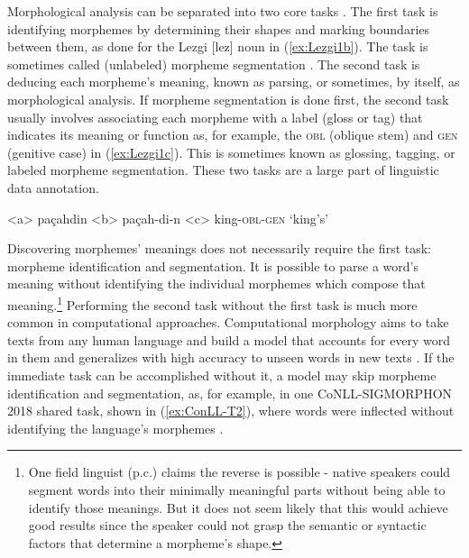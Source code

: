 \documentclass[12pt]{article}
\begin{document}
Morphological analysis can be separated into two core tasks \cite{cotterell_labeled_2015,hammarstrom_unsupervised_2011,nicolai_morphological_2017,palmer_semi-automated_2009}. The first task is identifying morphemes by determining their shapes and marking boundaries between them, as done for the Lezgi [lez] noun in (\ref{ex:Lezgi1b}). The task is sometimes called (unlabeled) morpheme segmentation \cite{creutz_unsupervised_2007,snyder_unsupervised_2008}. The second task is deducing each morpheme's meaning, known as parsing, or sometimes, by itself, as morphological analysis. If morpheme segmentation is done first, the second task usually involves associating each morpheme with a label (gloss or tag) that indicates its meaning or function as, for example, the \textsc{obl} (oblique stem) and \textsc{gen} (genitive case) in (\ref{ex:Lezgi1c}). This is sometimes known as glossing, tagging, or labeled morpheme segmentation. These two tasks are a large part of linguistic data annotation. 

\begin{singlespace}


\label{ex:Lezgi1}
\a<a> pa\c{c}ahdin 
\label{ex:Lezgi1a}
\a<b> pa\c{c}ah-di-n 
\label{ex:Lezgi1b}
\a<c> king-\textsc{obl}-\textsc{gen} 
\label{ex:Lezgi1c}
\a `king's'
\label{ex:Lezgi1d}
\xe

\end{singlespace}

Discovering morphemes'  meanings does not necessarily require the first task: morpheme identification and segmentation. It is possible to parse a word's meaning without identifying the individual morphemes which compose that meaning.\footnote{One field linguist (p.c.) claims the reverse is possible - native speakers could segment words into their minimally meaningful parts without being able to identify those meanings.  But it does not seem likely that this would achieve good results since the speaker could not grasp the semantic or syntactic factors that determine a morpheme’s shape.} Performing the second task without the first task is much more common in computational approaches. Computational morphology aims to take texts from any human language and build a model that accounts for every word in them and generalizes with high accuracy to unseen words in new texts \cite{goldsmith_computational_2017}. If the immediate task can be accomplished without it, a model may skip morpheme identification and segmentation, as, for example, in one CoNLL-SIGMORPHON 2018 shared task, shown in (\ref{ex:ConLL-T2}), where words were inflected without identifying the language's morphemes \cite{cotterell_conllsigmorphon_2018}.
\end{document}
